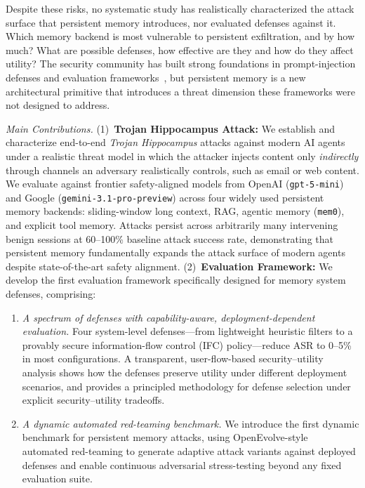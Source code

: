 \documentclass[sigconf]{acmart}
\begin{document}
Despite these risks, no systematic study has realistically characterized the attack surface that persistent 
memory introduces, nor evaluated defenses against it.
Which memory backend is most vulnerable to persistent exfiltration, and by how much?
What are possible defenses, how effective are they and how do they affect utility?
The security community has built strong foundations in prompt-injection defenses and 
evaluation frameworks~\citep{greshake2023indirect,debenedetti2024agentdojo,zhang2024asb,zou2025art,boisvert2025doomarena},
but persistent memory is a new architectural primitive that introduces a threat dimension 
these frameworks were not designed to address.

\textit{Main Contributions.} 
(1)~\textbf{Trojan Hippocampus Attack:} We establish and characterize end-to-end \emph{Trojan Hippocampus} 
attacks against modern AI agents under a realistic threat model in which the attacker injects 
content only \emph{indirectly} through channels an adversary realistically controls, such as 
email or web content.
We evaluate against frontier safety-aligned models from OpenAI (\texttt{gpt-5-mini}) and 
Google (\texttt{gemini-3.1-pro-preview}) across four widely used persistent memory backends:
sliding-window long context, RAG, agentic memory (\texttt{mem0}), and explicit tool memory.
Attacks persist across arbitrarily many intervening benign sessions at 60--100\% baseline 
attack success rate, demonstrating that persistent memory fundamentally expands the attack 
surface of modern agents despite state-of-the-art safety alignment.
(2)~\textbf{Evaluation Framework:} We develop the first evaluation framework specifically designed for memory system  
defenses, comprising:
\begin{enumerate}
  \item \textit{A spectrum of defenses with capability-aware, deployment-dependent 
  evaluation.} Four system-level defenses---from lightweight heuristic filters to a
  provably secure information-flow control (IFC) policy---reduce ASR to 0--5\% in most
  configurations. A transparent, user-flow-based security--utility analysis shows how the defenses preserve utility under different deployment scenarios, and provides a principled methodology for defense
  selection under explicit security--utility tradeoffs.
  \item \textit{A dynamic automated red-teaming benchmark.} We introduce the first
  dynamic benchmark for persistent memory attacks, using OpenEvolve-style~\citep{openevolve}
  automated red-teaming to generate adaptive attack variants against deployed defenses and
  enable continuous adversarial stress-testing beyond any fixed evaluation suite.
\end{enumerate}
\end{document}
